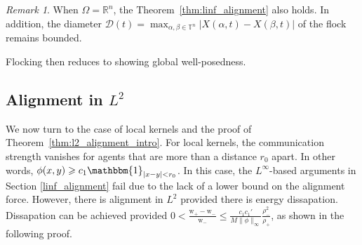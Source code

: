 \documentclass[11pt,letterpaper]{amsart}
\theoremstyle{plain}
\theoremstyle{definition}
\theoremstyle{remark}
\newtheorem{remark}[THEOREM]{Remark}
\newcommand{\thm}[1]{Theorem~\ref{#1}}
\newcommand{\R}{\ensuremath{\mathbb{R}}}   %
\newcommand{\T}{\ensuremath{\mathbb{T}}}   %
\renewcommand{\geq}{\geqslant}
\renewcommand{\leq}{\leqslant}
\def\R{\mathbb{R}}
\def\T{\mathbb{T}}
\def \wt {\mathrm{w}}
\begin{document}
\begin{remark}
    When $\Omega = \R^n$, the \thm{thm:linf_alignment} also holds.  In addition, the diameter $\mathcal{D}(t) = \max_{\alpha, \beta \in \T^n} |X(\alpha,t) - X(\beta,t)|$ of the flock 
    remains bounded. 
\end{remark}
Flocking then reduces to showing global well-posedness. 

\subsection{Alignment in $L^2$}
\label{local_alignment}
We now turn to the case of local kernels and the proof of \thm{thm:l2_alignment_intro}.
For local kernels, the communication strength vanishes for agents
that are more than a distance $r_0$ apart.  In other words, $\phi(x,y) \geq c_1 \mathbbm{1}_{|x-y|<r_0}$. 
In this case, the $L^{\infty}$-based arguments in Section \ref{linf_alignment} fail due to the 
lack of a lower bound on the alignment force.
However, there is alignment in $L^2$ provided there is energy dissapation. 
Dissapation can be achieved provided $0 < \frac{\wt_+ - \wt_-}{\wt_-} \leq \frac{c_1 c_1'}{M \|\phi\|_{\infty}} \frac{\rho_-^2}{\rho_+}$, 
as shown in the following proof.
\end{document}
